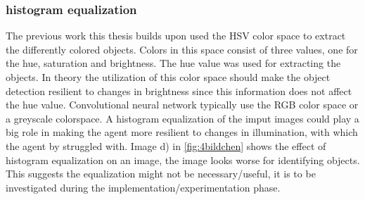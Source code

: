\subsubsection{histogram equalization}

The previous work this thesis builds upon used the HSV color space to extract the differently colored objects. Colors in this space consist of three values, one for the hue, saturation and brightness. The hue value was used for extracting the objects. In theory the utilization of this color space should make the object detection resilient to changes in brightness since this information does not affect the hue value.
Convolutional neural network typically use the RGB color space or a greyscale colorspace. A histogram equalization of the imput images could play a big role in making the agent more resilient to changes in illumination, with which the agent by \autocite{maximilian} struggled with. Image d) in \ref{fig:4bildchen} shows the effect of histogram equalization on an image, the image looks worse for identifying objects. This suggests the equalization might not be necessary/useful, it is to be investigated during the implementation/experimentation phase.




